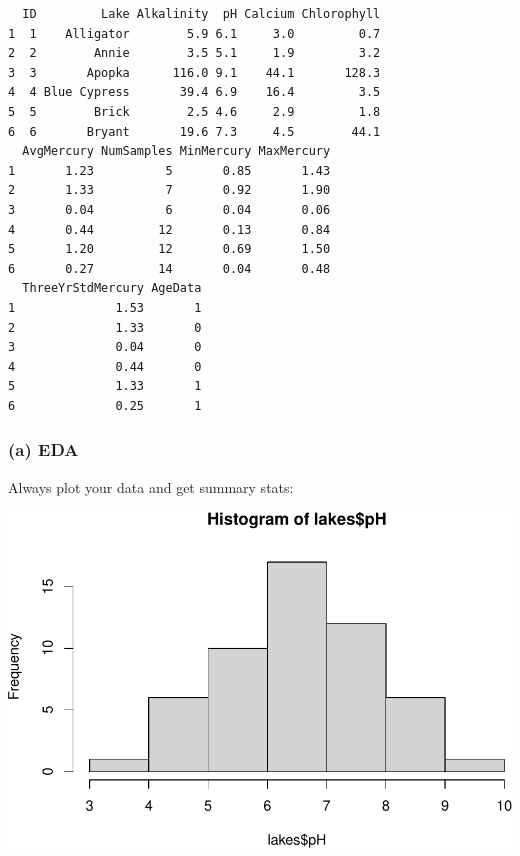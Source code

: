 \documentclass[
]{book}
\newenvironment{Shaded}{\begin{snugshade}}{\end{snugshade}}
\newcommand{\FunctionTok}[1]{\textcolor[rgb]{0.00,0.00,0.00}{#1}}
\newcommand{\NormalTok}[1]{#1}
\newcommand{\SpecialCharTok}[1]{\textcolor[rgb]{0.00,0.00,0.00}{#1}}
\begin{document}
\begin{verbatim}
  ID         Lake Alkalinity  pH Calcium Chlorophyll
1  1    Alligator        5.9 6.1     3.0         0.7
2  2        Annie        3.5 5.1     1.9         3.2
3  3       Apopka      116.0 9.1    44.1       128.3
4  4 Blue Cypress       39.4 6.9    16.4         3.5
5  5        Brick        2.5 4.6     2.9         1.8
6  6       Bryant       19.6 7.3     4.5        44.1
  AvgMercury NumSamples MinMercury MaxMercury
1       1.23          5       0.85       1.43
2       1.33          7       0.92       1.90
3       0.04          6       0.04       0.06
4       0.44         12       0.13       0.84
5       1.20         12       0.69       1.50
6       0.27         14       0.04       0.48
  ThreeYrStdMercury AgeData
1              1.53       1
2              1.33       0
3              0.04       0
4              0.44       0
5              1.33       1
6              0.25       1
\end{verbatim}

\hypertarget{a-eda-1}{%
\subsubsection{(a) EDA}\label{a-eda-1}}

Always plot your data and get summary stats:

\begin{Shaded}
\end{Shaded}

\includegraphics[width=1\linewidth]{Class_Activity_19_files/figure-latex/unnamed-chunk-2-1}
\end{document}
